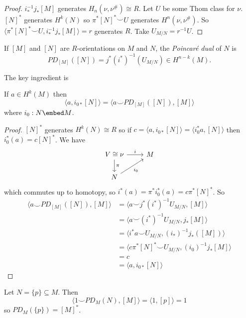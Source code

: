 \documentclass[a4paper]{article}
\newcommand*{\cp}{\smile} %
\begin{document}
\begin{proof}
  \(i_*^{-1} j_* [M]\) generates \(H_n(\nu, \nu^\#) \cong R\). Let \(U\) be some Thom class for \(\nu\). \([N]^*\) generates \(H^k(N)\) so \(\pi^*[N]^* \cp U\) generates \(H^n(\nu, \nu^\#)\). So \(\langle \pi^* [N]^* \cp U, i_*^{-1} j_* [M] \rangle = r\) generates \(R\). Take \(U_{M/N} = r^{-1}U\).
\end{proof}

\begin{definition}
  If \([M]\) and \([N]\) are \(R\)-orientations on \(M\) and \(N\), the \emph{Poincaré dual} of \(N\) is
  \[
    PD_{[M]}([N]) = j^*(i^*)^{-1} (U_{M/N}) \in H^{n - k}(M).
  \]
\end{definition}

The key ingredient is
\begin{proposition}
  If \(a \in H^k(M)\) then
  \[
    \langle a, i_{0*} [N] \rangle = \langle a\cp PD_{[M]}([N]), [M] \rangle
  \]
  where \(i_0: N \embed M\).
\end{proposition}

\begin{proof}
  \([N]^*\) generates \(H^k(N) \cong R\) so if \(c = \langle a, i_{0*}[N] \rangle = \langle i_0^* a, [N] \rangle\) then \(i_0^*(a) = c [N]^*\). We have
  \[
    \begin{tikzcd}
      V \cong \nu \ar[r, "i"] \ar[d, "\pi"] & M \\
      N \ar[ur, "i_0"']
    \end{tikzcd}
  \]
  which commutes up to homotopy, so \(i^*(a) = \pi^* i_0^*(a) = c \pi^*[N]^*\). So
  \begin{align*}
    \langle a \cp PD_{[M]}([N]), [M] \rangle
    &= \langle a \cp j^* (i^*)^{-1} U_{M/N}, [M] \rangle \\
    &= \langle a \cp (i^*)^{-1} U_{M/N}, j_*[M] \rangle \\
    &= \langle i^* a \cp U_{M/N}, (i_*)^{-1} j_*([M]) \rangle \\
    &= \langle c \pi^*[N]^* \cp U_{M/N}, (i_0)^{-1} j_* [M] \rangle \\\
    &= c \\
    &= \langle a, i_{0*}[N] \rangle
  \end{align*}
\end{proof}

\begin{eg}
  Let \(N = \{p\} \subseteq M\). Then
  \[
    \langle1 \cp PD_M(N), [M] \rangle = \langle 1, [p] \rangle = 1
  \]
  so \(PD_M(\{p\}) = [M]^*\).
\end{eg}
\end{document}
